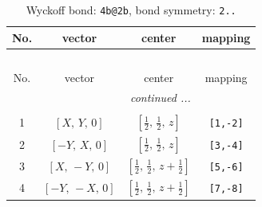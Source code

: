 \documentclass[fleqn,8pt]{jsarticle}
\begin{document}
\renewcommand{\arraystretch}{1.2}
\begin{longtable}{cccc}
\caption{Wyckoff bond: {\tt 4b@2b}, bond symmetry: {\tt 2..}}
 \\
 \hline \hline
No. & vector & center & mapping \\ \hline \endfirsthead

\multicolumn{3}{l}{\tablename\ \thetable{}} \\
 \hline \hline
No. & vector & center & mapping \\ \hline \endhead

 \hline \hline
\multicolumn{3}{r}{\footnotesize\it continued ...} \\ \endfoot

 \hline \hline
\multicolumn{3}{r}{} \\ \endlastfoot

1 & $\left[ X,\, Y,\, 0 \right]$ & $\left[ \frac{1}{2},\, \frac{1}{2},\, z \right]$ & {\tt [1,-2]} \\ \hline
2 & $\left[ - Y,\, X,\, 0 \right]$ & $\left[ \frac{1}{2},\, \frac{1}{2},\, z \right]$ & {\tt [3,-4]} \\ \hline
3 & $\left[ X,\, - Y,\, 0 \right]$ & $\left[ \frac{1}{2},\, \frac{1}{2},\, z + \frac{1}{2} \right]$ & {\tt [5,-6]} \\ \hline
4 & $\left[ - Y,\, - X,\, 0 \right]$ & $\left[ \frac{1}{2},\, \frac{1}{2},\, z + \frac{1}{2} \right]$ & {\tt [7,-8]} \\
\end{longtable}
\renewcommand{\arraystretch}{1.2}
\end{document}
